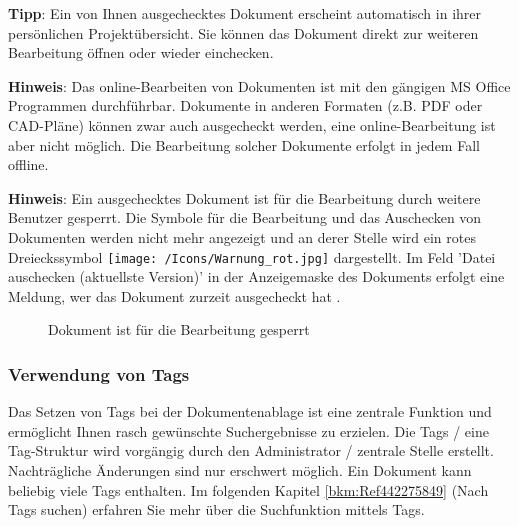 \vspace{\baselineskip}

\textbf{Tipp}: Ein von Ihnen ausgechecktes Dokument erscheint automatisch in ihrer persönlichen Projektübersicht. Sie können das Dokument direkt zur weiteren Bearbeitung öffnen oder wieder einchecken. \newline


\textbf{Hinweis}: Das online-Bearbeiten von Dokumenten ist mit den gängigen MS Office Programmen durchführbar. Dokumente in anderen Formaten (z.B. PDF oder CAD-Pläne) können zwar auch ausgecheckt werden, eine online-Bearbeitung ist aber nicht möglich. Die Bearbeitung solcher Dokumente erfolgt in jedem Fall offline. \newline


\textbf{Hinweis}: Ein ausgechecktes Dokument ist für die Bearbeitung durch weitere Benutzer gesperrt. Die Symbole für die Bearbeitung und das Auschecken von Dokumenten werden nicht mehr angezeigt und an derer Stelle wird ein rotes Dreieckssymbol \texttt{[image: /Icons/Warnung\_rot.jpg]}  dargestellt. Im Feld 'Datei auschecken (aktuellste Version)' in der Anzeigemaske des Dokuments erfolgt eine Meldung, wer das Dokument zurzeit ausgecheckt hat .

\begin{figure}[H]
\caption{Dokument ist für die Bearbeitung gesperrt}
\end{figure}

\subsubsection{Verwendung von Tags}
\label{bkm:Ref201801219}

Das Setzen von Tags bei der Dokumentenablage ist eine zentrale Funktion und ermöglicht Ihnen rasch gewünschte Suchergebnisse zu erzielen. Die Tags / eine Tag-Struktur wird vorgängig durch den Administrator / zentrale Stelle erstellt. Nachträgliche Änderungen sind nur erschwert möglich. Ein Dokument kann beliebig viele Tags enthalten. Im folgenden Kapitel \ref{bkm:Ref442275849} (Nach Tags suchen) erfahren Sie mehr über die Suchfunktion mittels Tags. \newline


